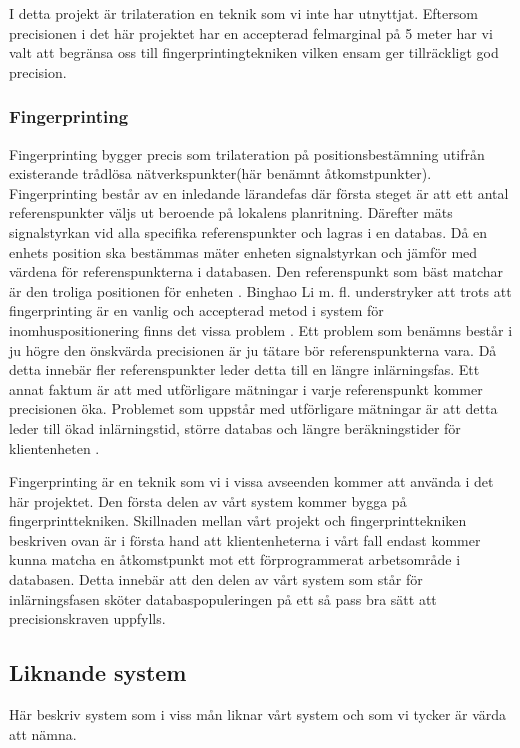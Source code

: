 \documentclass[swedish, a4paper,12pt]{article}
\begin{document}
I detta projekt är trilateration en teknik som vi inte har utnyttjat. Eftersom precisionen i det här projektet har en accepterad felmarginal på 5 meter har vi valt att begränsa oss till fingerprintingtekniken vilken ensam ger tillräckligt god precision.

\subsubsection{Fingerprinting} \label{fingerprinting}
Fingerprinting bygger precis som trilateration på positionsbestämning utifrån existerande trådlösa nätverkspunkter(här benämnt åtkomstpunkter). Fingerprinting består av en inledande lärandefas där första steget är att ett antal referenspunkter väljs ut beroende på lokalens planritning. Därefter mäts signalstyrkan vid alla specifika referenspunkter och lagras i en databas. %
Då en enhets position ska bestämmas mäter enheten signalstyrkan och jämför med värdena för referenspunkterna i databasen. Den referenspunkt som bäst matchar är den troliga positionen för enheten \cite{IP1}\cite{jun2018low}.
Binghao Li m. fl. understryker att trots att fingerprinting är en vanlig och accepterad metod i system för inomhuspositionering finns det vissa problem \cite{IP1}.
Ett problem som benämns består i ju högre den önskvärda precisionen är ju tätare bör referenspunkterna vara. Då detta innebär fler referenspunkter leder detta till en längre inlärningsfas. Ett annat faktum är att med utförligare mätningar i varje referenspunkt kommer precisionen öka. Problemet som uppstår med utförligare mätningar är att detta leder till ökad inlärningstid, större databas och längre beräkningstider för klientenheten \cite{IP1}.

Fingerprinting är en teknik som vi i vissa avseenden kommer att använda i det här projektet. Den första delen av vårt system kommer bygga på fingerprinttekniken. Skillnaden mellan vårt projekt och fingerprinttekniken beskriven ovan är i första hand att klientenheterna i vårt fall endast kommer kunna matcha en åtkomstpunkt mot ett förprogrammerat arbetsområde i databasen. Detta innebär att den delen av vårt system som står för inlärningsfasen sköter databaspopuleringen på ett så pass bra sätt att precisionskraven uppfylls.

\subsection{Liknande system}
Här beskriv system som i viss mån liknar vårt system och som vi tycker är värda att nämna.
\end{document}
